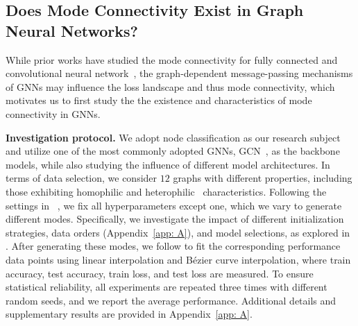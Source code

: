 \subsection{Does Mode Connectivity Exist in Graph Neural Networks?}\label{sec:lmc}

While prior works have studied the mode connectivity for fully connected and convolutional neural network~\cite{garipov2018loss, draxler2018essentially}, the graph-dependent message-passing mechanisms of GNNs may influence the loss landscape and thus mode connectivity, which motivates us to first study the the existence and characteristics of mode connectivity in GNNs.


\noindent\textbf{Investigation protocol.} We adopt node classification as our research subject and utilize one of the most commonly adopted GNNs, GCN~\cite{Kipf2016SemiSupervisedCW}, as the backbone models, while also studying the influence of different model architectures. In terms of data selection, we consider $12$ graphs with different properties, including those exhibiting homophilic and heterophilic~\cite{Ma2021IsHA} characteristics.  Following the settings in ~\cite{luo2024classic}, we fix all hyperparameters except one, which we vary to generate different modes. Specifically, we investigate the impact of different initialization strategies, data orders (Appendix~\ref{app: A}), and model selections, as explored in \citet{garipov2018loss,qin2022exploring}. 
After generating these modes, we follow \citet{garipov2018loss} to fit the corresponding performance data points using linear interpolation and Bézier curve interpolation, where train accuracy, test accuracy, train loss, and test loss are measured. To ensure statistical reliability, all experiments are repeated three times with different random seeds, and we report the average performance. Additional details and supplementary results are provided in Appendix~\ref{app: A}.

